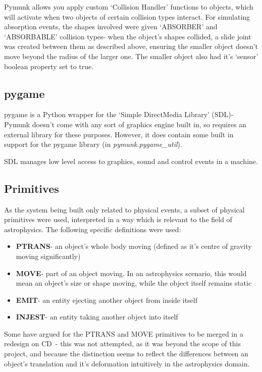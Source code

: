 \documentclass[dissertation.tex]{subfiles}
\begin{document}
    Pymunk allows you apply custom `Collision Handler' functions to objects, which will activate when two objects of certain collision types interact. For simulating absorption events, the shapes involved were given `ABSORBER' and `ABSORBABLE' collision types- when the object's shapes collided, a slide joint was created between them as described above, ensuring the smaller object doesn't move beyond the radius of the larger one. The smaller object also had it's `sensor' boolean property set to true.

    \subsection{pygame}
    pygame is a Python wrapper for the `Simple DirectMedia Library' (SDL)\cite{pygame}- Pymunk doesn't come with any sort of graphics engine built in, so requires an external library for these purposes. However, it does contain some built in support for the pygame library (in \textit{pymunk.pygame\_util}).
    
    SDL manages low level access to graphics, sound and control events in a machine.\cite{SDL}

    \subsection{Primitives}
    As the system being built only related to physical events, a subset of physical primitives were used, interpreted in a way which is relevant to the field of astrophysics. The following specific definitions were used:
    \begin{itemize}
        \item \textbf{PTRANS}- an object's whole body moving (defined as it's centre of gravity moving significantly)
        \item \textbf{MOVE}- part of an object moving. In an astrophysics scenario, this would mean an object's size or shape moving, while the object itself remains static %
        \item \textbf{EMIT}- an entity ejecting another object from inside itself
        \item \textbf{INJEST}- an entity taking another object into itself
    \end{itemize}

    Some have argued for the PTRANS and MOVE primitives to be merged in a redesign on CD~\cite{macbethimage}- this was not attempted, as it was beyond the scope of this project, and because the distinction seems to reflect the differences between an object's translation and it's deformation intuitively in the astrophysics domain.
\end{document}
